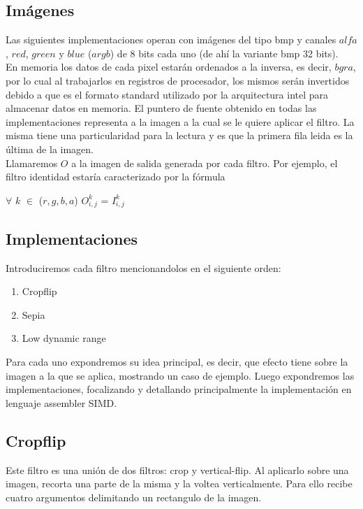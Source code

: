 \subsection{Imágenes}

Las siguientes implementaciones operan con imágenes del tipo bmp y canales $alfa$, $red$, $green$ y $blue$ ($argb$) de 8 bits cada uno (de ahí la variante bmp 32 bits).\\

En memoria los datos de cada pixel estarán ordenados a la inversa, es decir, $bgra$, por lo cual al trabajarlos en registros de procesador, los mismos serán invertidos debido a que es el formato standard utilizado por la arquitectura intel para almacenar datos en memoria.
El puntero de fuente obtenido en todas las implementaciones representa a la imagen a la cual se le quiere aplicar el filtro. La misma tiene una particularidad para la lectura y es que la primera fila leida es la última de la imagen.\\

Llamaremos $O$ a la imagen de salida generada por cada filtro. Por ejemplo, el filtro identidad
estaría caracterizado por la fórmula\\

\begin{center}
$\forall$ $k$ $\in$ ($r, g, b, a$) $O^{k}_{i,j}$ = $I^{k}_{i,j}$
\end{center}

\subsection{Implementaciones}
Introduciremos cada filtro mencionandolos en el siguiente orden:
 
\begin{enumerate}
\item Cropflip
\item Sepia
\item Low dynamic range 
\end{enumerate}

Para cada uno expondremos su idea principal, es decir, que efecto tiene sobre la imagen a la que se aplica, mostrando un caso de ejemplo. Luego expondremos las implementaciones, focalizando y detallando principalmente la implementación en lenguaje assembler SIMD.

\subsection{Cropflip}
Este filtro es una unión de dos filtros: crop y vertical-flip. Al aplicarlo sobre una imagen, recorta una parte de la misma y la voltea verticalmente. Para ello recibe cuatro argumentos delimitando un rectangulo de la imagen.

